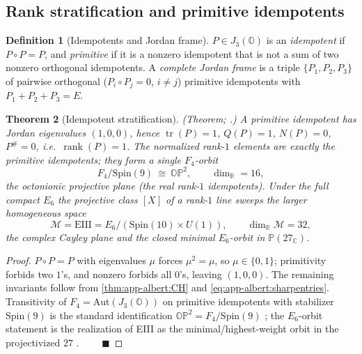 \documentclass[11pt]{article}
\theoremstyle{plain}
\newtheorem{theorem}{Theorem}[section]
\theoremstyle{definition}
\newtheorem{definition}[theorem]{Definition}
\theoremstyle{remark}
\begin{document}
\subsection{Rank stratification and primitive idempotents}
\label{sec:app-albert:idempotents}

\begin{definition}[Idempotents and Jordan frame]\label{def:app-albert:idemp}
$P\in J_3(\mathbb O)$ is an \emph{idempotent} if $P\circ P=P$, and
\emph{primitive} if it is a nonzero idempotent that is not a sum of two nonzero
orthogonal idempotents. A \emph{complete Jordan frame} is a triple
$\{P_1,P_2,P_3\}$ of pairwise orthogonal ($P_i\circ P_j=0$, $i\neq j$) primitive
idempotents with $P_1+P_2+P_3=E$.
\end{definition}

\begin{theorem}[Idempotent stratification]\label{thm:app-albert:idemp}
\textup{(Theorem; \cite{McCrimmon:2004,Yokota:2009}.)}
A primitive idempotent has Jordan eigenvalues $(1,0,0)$, hence
$\operatorname{tr}(P)=1$, $Q(P)=1$, $N(P)=0$, $P^\#=0$, i.e.\
$\operatorname{rank}(P)=1$. The normalized rank-$1$ elements are exactly the
primitive idempotents; they form a single $F_4$-orbit
\begin{equation}\label{eq:app-albert:OP2}
  F_4/\mathrm{Spin}(9)\ \cong\ \mathbb{OP}^2,
  \qquad \dim_{\mathbb R}=16,
\end{equation}
the octonionic projective plane (the real rank-$1$ idempotents). Under the full
\emph{compact} $E_6$ the projective class $[X]$ of a rank-$1$ line sweeps the
larger homogeneous space
\begin{equation}\label{eq:app-albert:EIII}
  \mathcal M=\mathrm{EIII}=E_6/(\mathrm{Spin}(10)\times U(1)),
  \qquad \dim_{\mathbb R}\mathcal M=32,
\end{equation}
\label{cor:VacuumManifold}
the complex Cayley plane and the closed minimal $E_6$-orbit in
$\mathbb P(27_{\mathbb C})$.
\end{theorem}

\begin{proof}
$P\circ P=P$ with eigenvalues $\mu$ forces $\mu^2=\mu$, so $\mu\in\{0,1\}$;
primitivity forbids two $1$'s, and nonzero forbids all $0$'s, leaving $(1,0,0)$.
The remaining invariants follow from \autoref{thm:app-albert:CH} and
\eqref{eq:app-albert:sharpentries}. Transitivity of $F_4=\mathrm{Aut}(J_3(\mathbb
O))$ on primitive idempotents with stabilizer $\mathrm{Spin}(9)$ is the standard
identification $\mathbb{OP}^2=F_4/\mathrm{Spin}(9)$
\cite{Baez:2002,Yokota:2009}; the $E_6$-orbit statement is the realization of
EIII as the minimal/highest-weight orbit in the projectivized $27$
\cite{Springer:2000}. $\qquad\blacksquare$
\end{proof}
\end{document}
